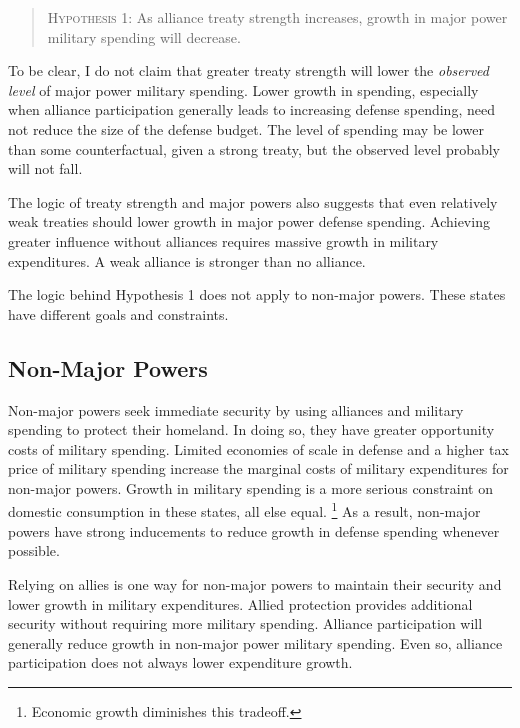 \documentclass[12pt]{article}
\begin{document}
\begin{quote}
\textsc{Hypothesis 1}: As alliance treaty strength increases, growth in major power military spending will decrease. 
\end{quote}


To be clear, I do not claim that greater treaty strength will lower the \textit{observed level} of major power military spending. 
Lower growth in spending, especially when alliance participation generally leads to increasing defense spending, need not reduce the size of the defense budget. 
The level of spending may be lower than some counterfactual, given a strong treaty, but the observed level probably will not fall. 


The logic of treaty strength and major powers also suggests that even relatively weak treaties should lower growth in major power defense spending. 
Achieving greater influence without alliances requires massive growth in military expenditures. 
A weak alliance is stronger than no alliance. 


The logic behind Hypothesis 1 does not apply to non-major powers. 
These states have different goals and constraints. 


\subsection{Non-Major Powers} 


Non-major powers seek immediate security by using alliances and military spending to protect their homeland.  
In doing so, they have greater opportunity costs of military spending. 
Limited economies of scale in defense and a higher tax price of military spending increase the marginal costs of military expenditures for non-major powers. 
Growth in military spending is a more serious constraint on domestic consumption in these states, all else equal.
\footnote{Economic growth diminishes this tradeoff.} 
As a result, non-major powers have strong inducements to reduce growth in defense spending whenever possible.


Relying on allies is one way for non-major powers to maintain their security and lower growth in military expenditures.  
Allied protection provides additional security without requiring more military spending. 
Alliance participation will generally reduce growth in non-major power military spending. 
Even so, alliance participation does not always lower expenditure growth.
 
\end{document}
